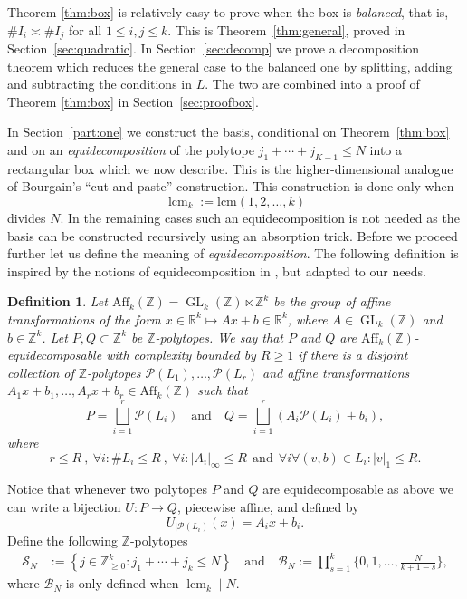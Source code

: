 \documentclass[a4paper,reqno,12pt]{amsart}
\theoremstyle{plain}
\theoremstyle{plain}
\newtheorem{definition}[theorem]{Definition}
\theoremstyle{remark}
\theoremstyle{plain}
\newcommand{\B}{\mathscr{B}}
\newcommand{\cP}{\mathscr{P}}
\newcommand{\cS}{\mathscr{S}}
\newcommand{\z}{\mathbb{Z}}
\newcommand{\RR}{\mathbb{R}}
\newcommand{\aff}{\text{Aff}}
\newcommand{\GL}{\operatorname{GL}}
\newcommand{\Z}{\mathbb{Z}}
\newcommand{\lcmk}{\operatorname{lcm}_k}
\theoremstyle{plain}
\theoremstyle{plain}
\begin{document}
{Theorem \ref{thm:box} is relatively easy to prove when the box is \textit{balanced}, that is,
$\# I_i \asymp \# I_j$ for all $1 \leq i, j \leq k$. This is Theorem~\ref{thm:general}, proved in
Section~\ref{sec:quadratic}. In Section~\ref{sec:decomp} we prove a decomposition theorem which
reduces the general case to the balanced one by splitting, adding and subtracting the conditions
in $L$. The two are combined into a proof of Theorem \ref{thm:box} in Section~\ref{sec:proofbox}.

In Section~\ref{part:one} we construct the basis, conditional on Theorem~\ref{thm:box} and on an
\textit{equidecomposition} of the polytope $j_1 + \cdots + j_{K - 1} \leq N$ into a rectangular box
which we now describe. This is the higher-dimensional analogue of Bourgain's
``cut and paste'' construction. 
This construction is done only when
$$
\lcmk := \text{lcm}(1,2,\ldots, k)
$$
divides $N$. In the remaining cases such an equidecomposition is not needed as the basis can be constructed recursively using an absorption trick. Before we proceed further let us define the meaning of \textit{equidecomposition}. The following definition is inspired by the notions of equidecomposition in \cite{HNP,HM08,KKMS}, but adapted to our needs.

\begin{definition}\label{def:equicomp}
Let $\aff_k(\Z) = \GL_k(\Z) \ltimes \Z^k $ be the group of affine transformations of the form $x\in \RR^k \mapsto Ax+b \in \RR^k$, where $A \in \GL_k(\Z)$ and $b\in \Z^k$. Let $P,Q\subset \mathbb Z^k$ be $\Z$-polytopes. We say that $P$ and $Q$ are \emph{$\aff_k(\Z)$-equidecomposable with complexity bounded by $R \geq 1$} if there is a disjoint collection of $\Z$-polytopes $\cP(L_1), \ldots, \cP(L_r)$ and aﬃne transformations $A_1 x + b_1,\ldots, A_r x + b_r \in \aff_k(\z)$ such that
\[
P = \bigsqcup_{i=1}^r {\cP(L_i)} \quad \text{and}  \quad Q = \bigsqcup_{i=1}^r (A_i \cP(L_i) + b_i),
\]
where
\[
r\leq R \ , \ \forall i: \# L_i \leq R \ , \ \forall i: |A_i|_\infty \leq R \ \ \text{and}\ \  \forall i \forall (v,b) \in L_i:   |v|_1 \leq R.
\]
\end{definition}
Notice that whenever two polytopes $P$ and $Q$ are equidecomposable as above we can write
a bijection $U : P \rightarrow Q$, piecewise affine, and defined by 
$$
U_{|\cP(L_i)}(x) = A_i x + b_i.
$$
Define the following $\Z$-polytopes
\begin{align}\label{eq:originalSimplexAndBox}
\cS_N&:=\left\{j\in \Z_{\ge0}^k:
  j_1+\cdots+j_k\le N\right\} \quad \text{and} \quad
\B_N:=\prod_{s=1}^k \bigg\{0,1,\ldots, \frac{N}{k+1-s}\bigg\},
\end{align}
where $\B_N$ is only defined when $\lcmk \mid N$.

}
\end{document}
